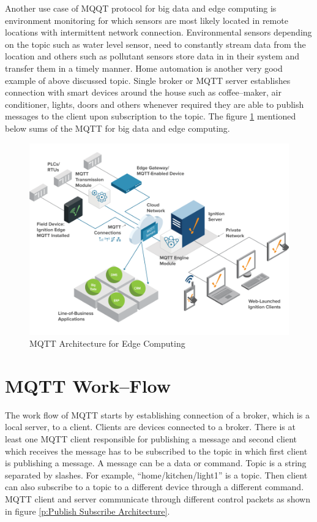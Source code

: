 \documentclass[sigconf]{acmart}
\begin{document}
Another use case of MQQT protocol for big data and edge computing is environment monitoring for which sensors are most likely located in remote locations with intermittent network  connection. Environmental sensors depending on the topic such as water level sensor, need to constantly stream data from the location and others such as pollutant sensors store data in in their system and transfer them in a timely manner. Home automation is another  very good example of above discussed topic. Single broker or MQTT server establishes connection with smart devices around the house such as coffee--maker, air conditioner, lights, doors and others whenever required they are able to publish messages to the client upon subscription to the topic. The figure \ref{p:MQTT Architecture for Edge Computing} mentioned below sums of the MQTT for big data and edge computing.
\begin{figure}
\includegraphics[width=1.0\columnwidth]{images/mqttArchitectureforEdgeComputing.png}
\caption{MQTT Architecture for Edge Computing}\label{p:MQTT Architecture for Edge Computing}


\end{figure}






\section{MQTT Work--Flow}
The work flow of MQTT starts by establishing connection of a broker, which is a local server, to a client. Clients are devices connected to a broker. There is at least one MQTT client responsible for publishing a message and second client which receives the message has to be subscribed to the topic in which first client is publishing a message. A message can be a data or command. Topic is a string separated by slashes. For example, ``home/kitchen/light1'' is a topic. Then client can also subscribe to a topic to a different device through a different command. MQTT client and server communicate through different control packets as shown in figure \ref{p:Publish Subscribe Architecture}.
\end{document}
